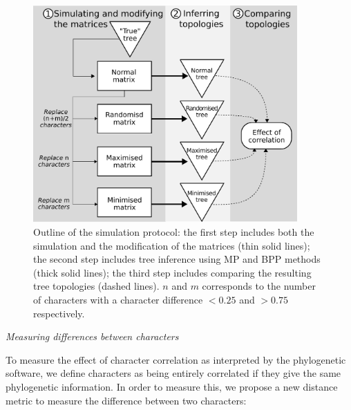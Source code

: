 \documentclass[12pt,letterpaper]{article}
\renewcommand{\subsection}[1]{%
\bigskip
\begin{center}
\begin{large}
\normalfont\itshape #1
\end{large}
\end{center}}
\begin{document}
\begin{figure}[!htbp]
\centering
   \includegraphics[width=0.9\textwidth]{Figures/outline.pdf}
\caption{Outline of the simulation protocol: the first step includes both the simulation and the modification of the matrices (thin solid lines); the second step includes tree inference using MP and BPP methods (thick solid lines); the third step includes comparing the resulting tree topologies (dashed lines). $n$ and $m$ corresponds to the number of characters with a character difference $<0.25$ and $>0.75$ respectively.}
\label{Fig:outline}
\end{figure}

\subsection{Measuring differences between characters}
\label{CD_description}
To measure the effect of character correlation as interpreted by the phylogenetic software, we define characters as being entirely correlated if they give the same phylogenetic information.
In order to measure this, we propose a new distance metric to measure the difference between two characters:
\end{document}
